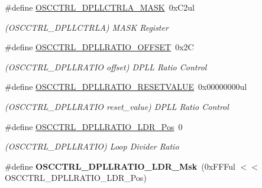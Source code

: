 \begin{DoxyCompactItemize}
\item 
\hypertarget{group___s_a_m_l21___o_s_c_c_t_r_l_gad1b1636763f7932da29230659b6f1482}{}\#define \hyperlink{group___s_a_m_l21___o_s_c_c_t_r_l_gad1b1636763f7932da29230659b6f1482}{O\+S\+C\+C\+T\+R\+L\+\_\+\+D\+P\+L\+L\+C\+T\+R\+L\+A\+\_\+\+M\+A\+S\+K}~0x\+C2ul\label{group___s_a_m_l21___o_s_c_c_t_r_l_gad1b1636763f7932da29230659b6f1482}

\begin{DoxyCompactList}\small\item\em (O\+S\+C\+C\+T\+R\+L\+\_\+\+D\+P\+L\+L\+C\+T\+R\+L\+A) M\+A\+S\+K Register \end{DoxyCompactList}\item 
\hypertarget{group___s_a_m_l21___o_s_c_c_t_r_l_ga60bf82218bf0deb9cc9cfcc05db4f5ee}{}\#define \hyperlink{group___s_a_m_l21___o_s_c_c_t_r_l_ga60bf82218bf0deb9cc9cfcc05db4f5ee}{O\+S\+C\+C\+T\+R\+L\+\_\+\+D\+P\+L\+L\+R\+A\+T\+I\+O\+\_\+\+O\+F\+F\+S\+E\+T}~0x2\+C\label{group___s_a_m_l21___o_s_c_c_t_r_l_ga60bf82218bf0deb9cc9cfcc05db4f5ee}

\begin{DoxyCompactList}\small\item\em (O\+S\+C\+C\+T\+R\+L\+\_\+\+D\+P\+L\+L\+R\+A\+T\+I\+O offset) D\+P\+L\+L Ratio Control \end{DoxyCompactList}\item 
\hypertarget{group___s_a_m_l21___o_s_c_c_t_r_l_ga0644b362777fc4bd26ff3be75521a753}{}\#define \hyperlink{group___s_a_m_l21___o_s_c_c_t_r_l_ga0644b362777fc4bd26ff3be75521a753}{O\+S\+C\+C\+T\+R\+L\+\_\+\+D\+P\+L\+L\+R\+A\+T\+I\+O\+\_\+\+R\+E\+S\+E\+T\+V\+A\+L\+U\+E}~0x00000000ul\label{group___s_a_m_l21___o_s_c_c_t_r_l_ga0644b362777fc4bd26ff3be75521a753}

\begin{DoxyCompactList}\small\item\em (O\+S\+C\+C\+T\+R\+L\+\_\+\+D\+P\+L\+L\+R\+A\+T\+I\+O reset\+\_\+value) D\+P\+L\+L Ratio Control \end{DoxyCompactList}\item 
\hypertarget{group___s_a_m_l21___o_s_c_c_t_r_l_ga8eca3bc229c889cd3d3779dc929c643f}{}\#define \hyperlink{group___s_a_m_l21___o_s_c_c_t_r_l_ga8eca3bc229c889cd3d3779dc929c643f}{O\+S\+C\+C\+T\+R\+L\+\_\+\+D\+P\+L\+L\+R\+A\+T\+I\+O\+\_\+\+L\+D\+R\+\_\+\+Pos}~0\label{group___s_a_m_l21___o_s_c_c_t_r_l_ga8eca3bc229c889cd3d3779dc929c643f}

\begin{DoxyCompactList}\small\item\em (O\+S\+C\+C\+T\+R\+L\+\_\+\+D\+P\+L\+L\+R\+A\+T\+I\+O) Loop Divider Ratio \end{DoxyCompactList}\item 
\hypertarget{group___s_a_m_l21___o_s_c_c_t_r_l_ga3dd373311774ab0d05a2f18d950b7212}{}\#define {\bfseries O\+S\+C\+C\+T\+R\+L\+\_\+\+D\+P\+L\+L\+R\+A\+T\+I\+O\+\_\+\+L\+D\+R\+\_\+\+Msk}~(0x\+F\+F\+Ful $<$$<$ O\+S\+C\+C\+T\+R\+L\+\_\+\+D\+P\+L\+L\+R\+A\+T\+I\+O\+\_\+\+L\+D\+R\+\_\+\+Pos)\label{group___s_a_m_l21___o_s_c_c_t_r_l_ga3dd373311774ab0d05a2f18d950b7212}


\end{DoxyCompactItemize}
